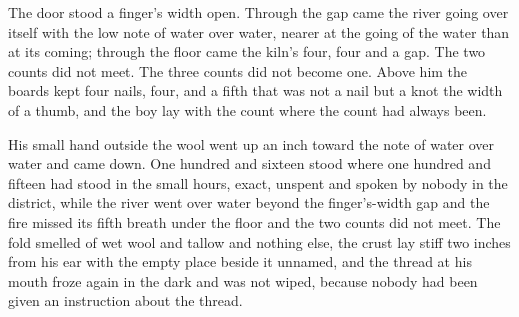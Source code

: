 The door stood a finger’s width open. Through the gap came the river going over itself with the low note of water over water, nearer at the going of the water than at its coming; through the floor came the kiln’s four, four and a gap. The two counts did not meet. The three counts did not become one. Above him the boards kept four nails, four, and a fifth that was not a nail but a knot the width of a thumb, and the boy lay with the count where the count had always been.

His small hand outside the wool went up an inch toward the note of water over water and came down. One hundred and sixteen stood where one hundred and fifteen had stood in the small hours, exact, unspent and spoken by nobody in the district, while the river went over water beyond the finger’s-width gap and the fire missed its fifth breath under the floor and the two counts did not meet. The fold smelled of wet wool and tallow and nothing else, the crust lay stiff two inches from his ear with the empty place beside it unnamed, and the thread at his mouth froze again in the dark and was not wiped, because nobody had been given an instruction about the thread.
